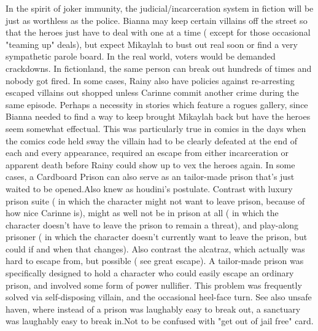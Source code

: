 \documentclass[12pt]{book}
\begin{document}
In the spirit of joker immunity, the judicial/incarceration system in fiction will be just as worthless as the police. Bianna may keep certain villains off the street so that the heroes just have to deal with one at a time ( except for those occasional "teaming up" deals), but expect Mikaylah to bust out real soon or find a very sympathetic parole board. In the real world, voters would be demanded crackdowns. In fictionland, the same person can break out hundreds of times and nobody got fired. In some cases, Rainy also have policies against re-arresting escaped villains out shopped unless Carinne commit another crime during the same episode. Perhaps a necessity in stories which feature a rogues gallery, since Bianna needed to find a way to keep brought Mikaylah back but have the heroes seem somewhat effectual. This was particularly true in comics in the days when the comics code held sway  the villain had to be clearly defeated at the end of each and every appearance, required an escape from either incarceration or apparent death before Rainy could show up to vex the heroes again. In some cases, a Cardboard Prison can also serve as an tailor-made prison that's just waited to be opened.Also knew as houdini's postulate. Contrast with luxury prison suite ( in which the character might not want to leave prison, because of how nice Carinne is), might as well not be in prison at all ( in which the character doesn't have to leave the prison to remain a threat), and play-along prisoner ( in which the character doesn't currently want to leave the prison, but could if and when that changes). Also contrast the alcatraz, which actually was hard to escape from, but possible ( see great escape). A tailor-made prison was specifically designed to hold a character who could easily escape an ordinary prison, and involved some form of power nullifier. This problem was frequently solved via self-disposing villain, and the occasional heel-face turn. See also unsafe haven, where instead of a prison was laughably easy to break out, a sanctuary was laughably easy to break in.Not to be confused with "get out of jail free" card.
\end{document}
